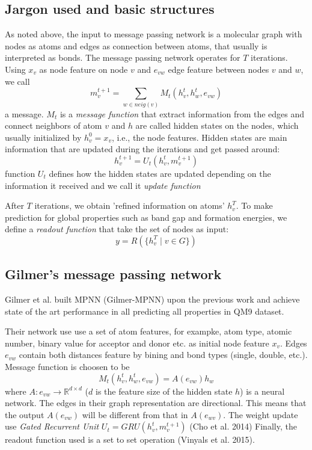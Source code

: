 \documentclass{article}
\begin{document}
\subsection{Jargon used and basic structures}
As noted above, the input to message passing network is a molecular graph with nodes as atoms and edges as 
connection between atoms, that usually is interpreted as bonds. 
The message passing network operates for $T$ iterations. 
Using $x_v$ as node feature on node $v$ and $e_{vw}$ edge feature between nodes $v$ and $w$, we call
\begin{equation}
    m_{v}^{t+1} = \sum_{w\in neig(v)} M_t(h^t_v, h^t_w, e_{vw})
\end{equation}
a message. $M_t$ is a \emph{message function} that extract information from the edges and connect neighbors of atom $v$ and 
$h$ are called hidden states on the nodes, which usually initialized by $h^0_v = x_v$, i.e., the node features. 
Hidden states are main information that are updated during the iterations and get passed around:
\begin{equation}
    h^{t+1}_v = U_t(h_v^t, m_{v}^{t+1})
\end{equation}
function $U_t$ defines how the hidden states are updated depending on the information it received and we call it 
\emph{update function}

After $T$ iterations, we obtain 'refined information on atoms' $h_v^T$. To make prediction for global properties 
such as band gap and formation energies, we define a \emph{readout function} that take the set of nodes as input:
\begin{equation}
    y = R(\{h_v^T\mid v\in G\})
\end{equation}

\subsection{Gilmer's message passing network}
Gilmer et al. built MPNN (Gilmer-MPNN) upon the previous work and achieve state of the art performance in all predicting all properties 
in QM9 dataset. 

Their network use use a set of atom features, for exampke, atom type, atomic number, binary value for acceptor and donor etc. as  
initial node feature $x_v$. Edges $e_{vw}$ contain both distances feature by bining and bond types (single, double, etc.). 
Message function is choosen to be 
\begin{equation}
    M_t(h^t_v, h^t_w, e_{vw}) = A(e_{vw}) h_w
\end{equation}
where $A\colon e_{vw} \to \mathbb{R}^{d\times d}$ ($d$ is the feature size of the hidden state $h$) is a neural network. 
The edges in their graph representation are directional. This means that the output $A(e_{vw})$ will be different from that 
in $A(e_{wv})$. 
The weight update use \emph{Gated Recurrent Unit} $U_t = GRU(h_v^t, m_v^{t+1})$ (Cho et al. 2014)
Finally, the readout function used is a set to set operation (Vinyals et al. 2015).
\end{document}
